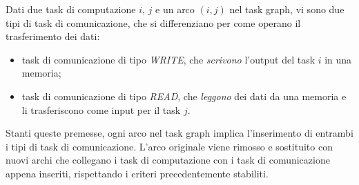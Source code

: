 Dati due task di computazione $i$, $j$ e un 
arco $(i,j)$ nel task graph, vi sono due tipi di task di comunicazione, che si 
differenziano per come operano il trasferimento dei dati:
\begin{itemize}
 \item task di comunicazione di tipo \emph{WRITE}, che \emph{scrivono} 
l'output del task $i$ in una memoria;
 \item task di comunicazione di tipo \emph{READ}, che \emph{leggono} dei dati 
da una memoria e li trasferiscono come input per il task $j$. 
\end{itemize}
Stanti queste premesse, ogni arco nel task graph implica l'inserimento di 
entrambi i tipi di task di comunicazione. L'arco originale viene rimosso e 
sostituito con nuovi archi che collegano i task di computazione con i task di 
comunicazione appena inseriti, rispettando i criteri precedentemente stabiliti.


